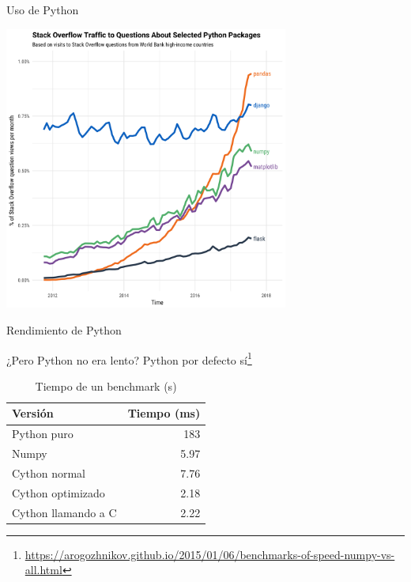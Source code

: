 \documentclass[bigger,unknownkeysallowed]{beamer}
\begin{document}
\begin{frame}[label={sec:org21c85de}]{Uso de Python}
\begin{center}
\begin{center}
\includegraphics[width=0.7\textwidth]{numpy_grown.png}
\end{center}
\end{center}
\end{frame}

\begin{frame}[label={sec:org227d41f}]{Rendimiento de Python}
\begin{block}{¿Pero Python no era lento?}
Python por defecto sí\footnote{\url{https://arogozhnikov.github.io/2015/01/06/benchmarks-of-speed-numpy-vs-all.html}}

\begin{table}[htbp]
\caption{Tiempo de un benchmark (s)}
\centering
\begin{tabular}{lr}
\hline
Versión & Tiempo (ms)\\
\hline
Python puro & 183\\
Numpy & 5.97\\
Cython normal & 7.76\\
Cython optimizado & 2.18\\
Cython llamando a C & 2.22\\
\hline
\end{tabular}
\end{table}
\end{block}
\end{frame}
\end{document}
